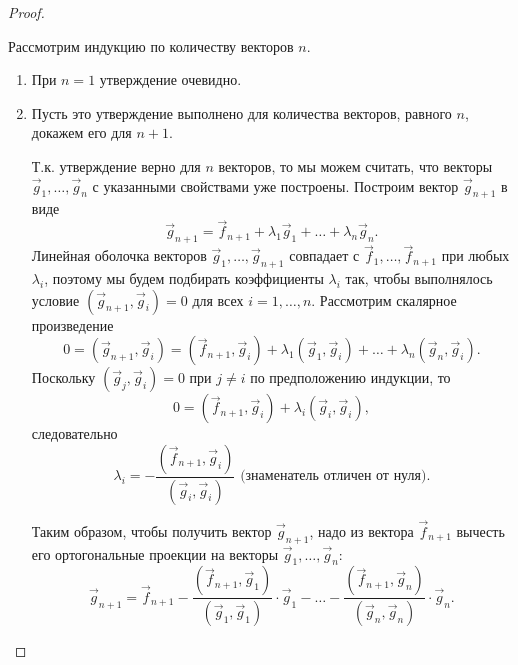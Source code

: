 \begin{proof}~

    Рассмотрим индукцию по количеству векторов $n$.
    \begin{enumerate}
        \item При $n = 1$ утверждение очевидно.
        \item Пусть это утверждение выполнено для количества векторов, равного $n$, докажем его для $n + 1$. 
        
        Т.к. утверждение верно для $n$ векторов, то мы можем считать, что векторы $\vec{g}_1, \ldots, \vec{g}_n$ с указанными свойствами уже построены. Построим вектор $\vec{g}_{n + 1}$ в виде 
        $$\vec{g}_{n + 1} = \vec{f}_{n + 1} + \lambda_1 \vec{g}_1 + \ldots + \lambda_n\vec{g}_n.$$ 
        Линейная оболочка векторов $\vec{g}_1, \ldots,  \vec{g}_{n + 1}$ совпадает с $\vec{f}_1, \ldots, \vec{f}_{n + 1}$ при любых $\lambda_i$, поэтому мы будем подбирать коэффициенты $\lambda_i$ так, чтобы выполнялось условие $(\vec{g}_{n + 1},  \vec{g}_i) = 0$ для всех $i = 1, \ldots, n$. Рассмотрим скалярное произведение $$0 = (\vec{g}_{n + 1}, \vec{g}_i) = (\vec{f}_{n + 1}, \vec{g}_i)+ \lambda_1(\vec{g}_1, \vec{g}_i) + \ldots + \lambda_n(\vec{g}_n, \vec{g}_i).$$
        Поскольку $(\vec{g}_j, \vec{g}_i) = 0$ при $j \ne i$ по предположению индукции, то 
        $$0 = (\vec{f}_{n + 1}, \vec{g}_i) + \lambda_i(\vec{g}_i, \vec{g}_i),$$ следовательно 
        $$\lambda_i = -\frac{(\vec{f}_{n + 1}, \vec{g}_i)}{(\vec{g}_i, \vec{g}_i)} \text{ (знаменатель отличен от нуля).}$$ 
        
        Таким образом, чтобы получить вектор $\vec{g}_{n + 1}$, надо из вектора $\vec{f}_{n + 1}$ вычесть его ортогональные проекции на векторы $\vec{g}_1, \ldots, \vec{g}_n$:
        $$\vec{g}_{n + 1} = \vec{f}_{n + 1} -\frac{(\vec{f}_{n + 1}, \vec{g}_1)}{(\vec{g}_1, \vec{g}_1)} \cdot \vec{g}_1 - \ldots -\frac{(\vec{f}_{n + 1}, \vec{g}_n)}{(\vec{g}_n, \vec{g}_n)} \cdot \vec{g}_n.$$
    \end{enumerate}
\end{proof}
